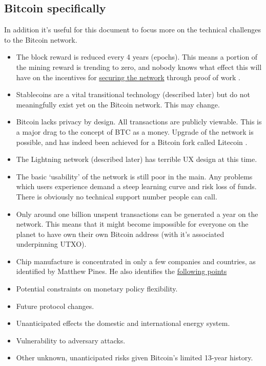 \subsection{Bitcoin specifically}
\noindent In addition it's useful for this document to focus more on the technical challenges to the Bitcoin network.\par
\begin{itemize}
\item The block reward is reduced every 4 years (epochs). This means a portion of the mining reward is trending to zero, and nobody knows what effect this will have on the incentives for \href{https://www.truthcoin.info/blog/security-budget-ii-mm/}{securing the network} through proof of work \cite{carlsten2016instability}.
\item Stablecoins are a vital transitional technology (described later) but do not meaningfully exist yet on the Bitcoin network. This may change.
\item Bitcoin lacks privacy by design. All transactions are publicly viewable. This is a major drag to the concept of BTC as a money. Upgrade of the network is possible, and has indeed been achieved for a Bitcoin fork called Litecoin \cite{fuchsbauer2019aggregate}. 
\item The Lightning network (described later) has terrible UX design at this time. 
\item The basic `usability' of the network is still poor in the main. Any problems which users experience demand a steep learning curve and risk loss of funds. There is obviously no technical support number people can call. 
\item Only around one billion unspent transactions can be generated a year on the network. This means that it might become impossible for everyone on the planet to have own their own Bitcoin address (with it's associated underpinning UTXO).  
\item Chip manufacture is concentrated in only a few companies and countries, as identified by Matthew Pines. He also identifies the \href{https://www.btcpolicy.org/#Research}{following points}
\item Potential constraints on monetary policy flexibility.
\item Future protocol changes.
\item Unanticipated effects the domestic and international energy system.
\item Vulnerability to adversary attacks.
\item Other unknown, unanticipated risks given Bitcoin’s limited 13-year history.
\end{itemize} 


%
